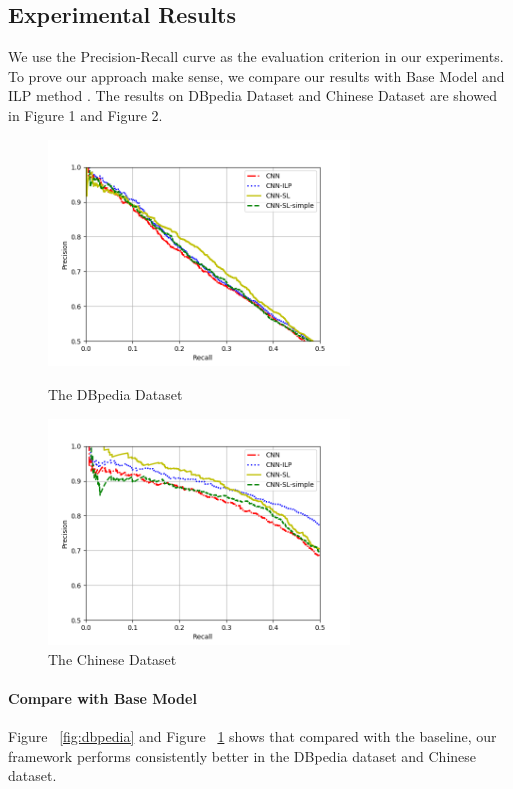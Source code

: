 \subsection{Experimental Results}
We use the Precision-Recall curve as the evaluation criterion in our experiments. To prove our approach make sense, we compare our results with Base Model \cite{lin2016neural} and ILP method \cite{chen2014encoding}. The results on DBpedia Dataset and Chinese Dataset are showed in Figure 1 and Figure 2.
\begin{figure}[htbp]
	\centering
	\begin{minipage}[t]{0.48\textwidth}
		\centering
		\includegraphics[width=8cm]{./result-figure/DBpedia-CNN-result.png}
		\caption{The DBpedia Dataset}
		\label{fig:dbpedia}
	\end{minipage}
	\begin{minipage}[t]{0.48\textwidth}
		\centering
		\includegraphics[width=8cm]{./result-figure/Chinese-CNN-result.png}
		\caption{The Chinese Dataset}
		\label{fig:chinese}
	\end{minipage}
\end{figure}

\paragraph{Compare with Base Model}
Figure ~\ref{fig:dbpedia} and Figure ~\ref{fig:chinese} shows that compared with the baseline, our framework performs consistently better in the DBpedia dataset and Chinese dataset. 

